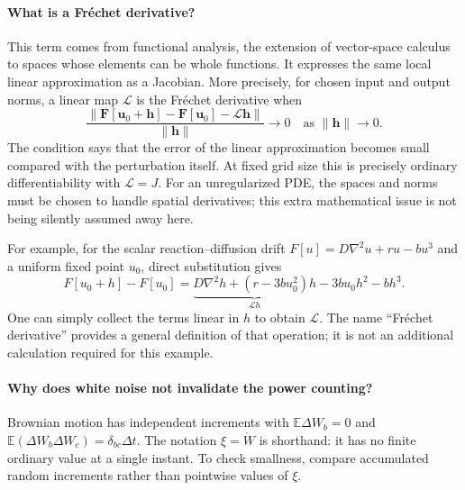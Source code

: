 \documentclass{article}
\begin{document}
\paragraph{What is a Fr\'echet derivative?}
This term comes from functional analysis, the extension of vector-space calculus to spaces whose elements can be whole functions. It expresses the same local linear approximation as a Jacobian. More precisely, for chosen input and output norms, a linear map $\mathcal L$ is the Fr\'echet derivative when
\begin{equation}
    \frac{\|\mathbf F[\mathbf u_0+\mathbf h]-\mathbf F[\mathbf u_0]
    -\mathcal L\mathbf h\|}{\|\mathbf h\|}\longrightarrow0
    \quad\text{as }\|\mathbf h\|\longrightarrow0.
\end{equation}
The condition says that the error of the linear approximation becomes small compared with the perturbation itself. At fixed grid size this is precisely ordinary differentiability with $\mathcal L=J$. For an unregularized PDE, the spaces and norms must be chosen to handle spatial derivatives; this extra mathematical issue is not being silently assumed away here.

For example, for the scalar reaction--diffusion drift $F[u]=D\nabla^2u+r u-bu^3$ and a uniform fixed point $u_0$, direct substitution gives
\begin{equation}
    F[u_0+h]-F[u_0]
    =\underbrace{D\nabla^2h+(r-3bu_0^2)h}_{\mathcal Lh}
    -3bu_0h^2-bh^3.
\end{equation}
One can simply collect the terms linear in $h$ to obtain $\mathcal L$. The name ``Fr\'echet derivative'' provides a general definition of that operation; it is not an additional calculation required for this example.

\paragraph{Why does white noise not invalidate the power counting?}
Brownian motion has independent increments with $\mathbb E\Delta W_b=0$ and $\mathbb E(\Delta W_b\Delta W_c)=\delta_{bc}\Delta t$. The notation $\xi=\dot W$ is shorthand: it has no finite ordinary value at a single instant. To check smallness, compare accumulated random increments rather than pointwise values of $\xi$.
\end{document}
